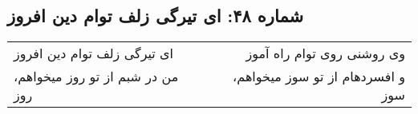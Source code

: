 \begin{center}
\section*{شماره ۴۸: ای تیرگی زلف توام دین افروز}
\label{sec:048}
\begin{longtable}{l p{0.5cm} r}
ای تیرگی زلف توام دین افروز
&&
وی روشنی روی توام راه آموز
\\
من در شبم از تو روز میخواهم، روز
&&
و افسردهام از تو سوز میخواهم، سوز
\\
\end{longtable}
\end{center}
